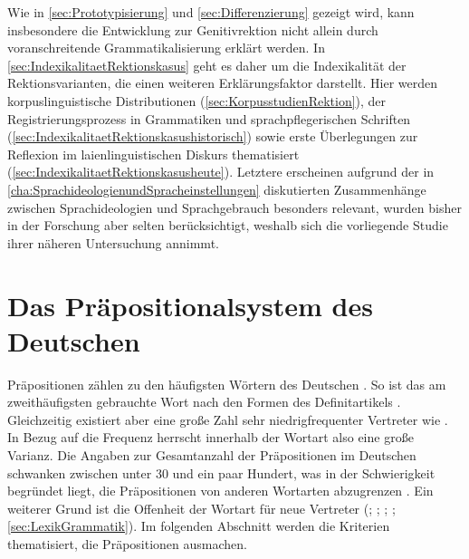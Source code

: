 Wie in \autoref{sec:Prototypisierung} und \autoref{sec:Differenzierung} gezeigt wird, kann insbesondere die Entwicklung zur Genitivrektion nicht allein durch voranschreitende Grammatikalisierung erklärt werden. 
In \autoref{sec:IndexikalitaetRektionskasus} geht es daher um die Indexikalität der Rektionsvarianten, die einen weiteren Erklärungsfaktor darstellt. 
Hier werden korpuslinguistische Distributionen (\autoref{sec:KorpusstudienRektion}), der Registrierungsprozess in Grammatiken und sprachpflegerischen Schriften (\autoref{sec:IndexikalitaetRektionskasushistorisch}) sowie erste Überlegungen zur Reflexion im laienlinguistischen Diskurs thematisiert (\autoref{sec:IndexikalitaetRektionskasusheute}). 
Letztere erscheinen aufgrund der in \autoref{cha:SprachideologienundSpracheinstellungen} diskutierten Zusammenhänge zwischen Sprachideologien und Sprachgebrauch besonders relevant, wurden bisher in der Forschung aber selten berücksichtigt, weshalb sich die vorliegende Studie ihrer näheren Untersuchung annimmt. 
\section{Das Präpositionalsystem des Deutschen} \label{sec:PraepDE}
Präpositionen zählen zu den häufigsten Wörtern des Deutschen \citep[s.][636--637]{Griehaber2009}. 
So ist  das am zweithäufigsten gebrauchte Wort nach den Formen des Definitartikels \citep[s.][]{InstitutfurDeutscheSprache2012}. 
Gleichzeitig existiert aber eine große Zahl sehr niedrigfrequenter Vertreter wie . 
In Bezug auf die Frequenz herrscht innerhalb der Wortart also eine große Varianz. 
Die Angaben zur Gesamtanzahl der Präpositionen im Deutschen schwanken zwischen unter 30 und ein paar Hundert, was in der Schwierigkeit begründet liegt, die Präpositionen von anderen Wortarten abzugrenzen \citep[s.][262]{Lindqvist1994}. 
Ein weiterer Grund ist die Offenheit der Wortart für neue Vertreter (\citealp[s.][526]{Eisenberg1979}; \citealp[17]{Lehmann1992}; \citealp[§896]{Duden2016}; \citealp[354]{Helbig.2017}; \autoref{sec:LexikGrammatik}).
Im folgenden Abschnitt werden die Kriterien thematisiert, die Präpositionen ausmachen. 
